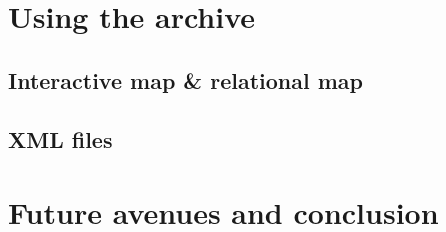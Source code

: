 \documentclass[]{book}
\begin{document}
\chapter{Using the archive}\label{using}

\section{Interactive map \& relational
map}\label{interactive-map-relational-map}

\section{XML files}\label{xml-files}

\chapter{Future avenues and conclusion}\label{future}


\end{document}
